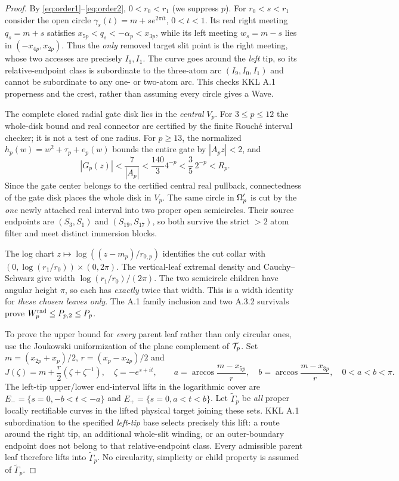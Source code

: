 \begin{proof}
By \eqref{eq:order1}--\eqref{eq:order2},
$0<r_0<r_1$ (we suppress $p$).
For $r_0<s<r_1$ consider the open
circle $\gamma_s(t)=m+s e^{2\pi it}$,
$0<t<1$.  Its real right meeting
$q_s=m+s$ satisfies
$x_{5p}<q_s<-\alpha_p<x_{3p}$,
while its left meeting $w_s=m-s$
lies in $(-x_{4p},x_{2p})$.
Thus the \emph{only} removed target
slit point is the right meeting,
whose two accesses are precisely
$I_9,I_1$.  The curve goes around
the \emph{left} tip, so its
relative-endpoint class is
subordinate to the three-atom
arc $(I_9,I_0,I_1)$ and cannot
be subordinate to any one-
or two-atom arc.  This checks
KKL A.1 properness and the crest,
rather than assuming every
circle gives a Wave.

The complete closed radial gate disk
lies in the \emph{central} $V_p$.
For $3\le p\le12$ the whole-disk
bound and real connector are
certified by the finite Rouch\'e
interval checker; it is not a
test of one radius.  For $p\ge13$,
the normalized $h_p(w)=w^2+\tau_p+e_p(w)$
bounds the entire gate by
$|A_pz|<2$, and
\[
 |G_p(z)|<\frac7{|A_p|}
 <\frac{140}{3}4^{-p}
 <\frac35\,2^{-p}<R_p.
\]
Since the gate center belongs to
the certified central real pullback,
connectedness of the gate disk
places the whole disk in $V_p$.
The same circle in $\Omega'_p$
is cut by the \emph{one} newly
attached real interval into two
proper open semicircles.  Their
source endpoints are $(S_3,S_1)$
and $(S_{19},S_{17})$, so both
survive the strict $>2$ atom
filter and meet distinct
immersion blocks.

The log chart
$z\mapsto\log((z-m_p)/r_{0,p})$
identifies the cut collar with
$(0,\log(r_1/r_0))\times(0,2\pi)$.
The vertical-leaf extremal density
and Cauchy--Schwarz give width
$\log(r_1/r_0)/(2\pi)$.
The two semicircle children have
angular height $\pi$, so each has
\emph{exactly} twice that width.
This is a width identity for
\emph{these chosen leaves only}.
The A.1 family inclusion and
two A.3.2 survivals prove
$W_p^{\rm rad}\le P_{p,2}\le P_p$.

To prove the upper bound for
\emph{every} parent leaf rather
than only circular ones, use the
Joukowski uniformization of the
plane complement of $\mathcal T_p$.
Set $m=(x_{2p}+x_p)/2$,
$r=(x_p-x_{2p})/2$ and
\[
 J(\zeta)=m+\frac r2(\zeta+\zeta^{-1}),
 \quad \zeta=-e^{s+it},\qquad
 a=\arccos\frac{m-x_{5p}}r,\quad
 b=\arccos\frac{m-x_{3p}}r,\quad0<a<b<\pi.
\]
The left-tip upper/lower
end-interval lifts in the
logarithmic cover are
$E_-=\{s=0,-b<t<-a\}$
and $E_+=\{s=0,a<t<b\}$.
Let $\widetilde\Gamma_p$
be \emph{all} proper
locally rectifiable curves
in the lifted physical
target joining these
sets.  KKL A.1
subordination to the
specified \emph{left-tip}
base selects precisely this
lift: a route around the
right tip, an additional
whole-slit winding, or
an outer-boundary endpoint
does not belong to that
relative-endpoint class.
Every admissible parent
leaf therefore lifts into
$\widetilde\Gamma_p$.
No circularity, simplicity
or child property is assumed
of $\widetilde\Gamma_p$.


\end{proof}
